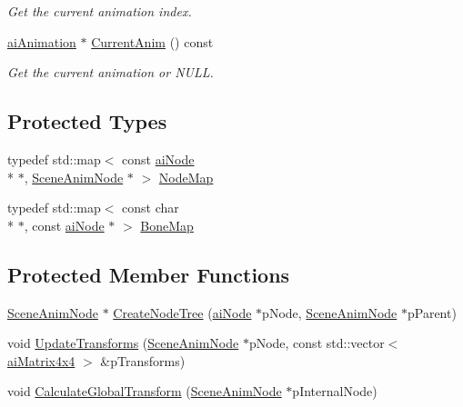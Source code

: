 \begin{DoxyCompactItemize}
\begin{DoxyCompactList}\small\item\em Get the current animation index. \end{DoxyCompactList}\item 
\hypertarget{class_assimp_view_1_1_scene_animator_a35c087279955cef0b9888d338bbd197d}{\hyperlink{structai_animation}{ai\+Animation} $\ast$ \hyperlink{class_assimp_view_1_1_scene_animator_a35c087279955cef0b9888d338bbd197d}{Current\+Anim} () const }\label{class_assimp_view_1_1_scene_animator_a35c087279955cef0b9888d338bbd197d}

\begin{DoxyCompactList}\small\item\em Get the current animation or N\+U\+L\+L. \end{DoxyCompactList}\end{DoxyCompactItemize}
\subsection*{Protected Types}
\begin{DoxyCompactItemize}
\item 
typedef std\+::map$<$ const \hyperlink{structai_node}{ai\+Node} \\*
$\ast$, \hyperlink{struct_assimp_view_1_1_scene_anim_node}{Scene\+Anim\+Node} $\ast$ $>$ \hyperlink{class_assimp_view_1_1_scene_animator_aa14c2ffd5c92d72e07905ce9a7f43c36}{Node\+Map}
\item 
typedef std\+::map$<$ const char \\*
$\ast$, const \hyperlink{structai_node}{ai\+Node} $\ast$ $>$ \hyperlink{class_assimp_view_1_1_scene_animator_a0d705443f7c558756e8816763a2777c2}{Bone\+Map}
\end{DoxyCompactItemize}
\subsection*{Protected Member Functions}
\begin{DoxyCompactItemize}
\item 
\hyperlink{struct_assimp_view_1_1_scene_anim_node}{Scene\+Anim\+Node} $\ast$ \hyperlink{class_assimp_view_1_1_scene_animator_a3bbce6d002dbbc7ec1a30fc467a97706}{Create\+Node\+Tree} (\hyperlink{structai_node}{ai\+Node} $\ast$p\+Node, \hyperlink{struct_assimp_view_1_1_scene_anim_node}{Scene\+Anim\+Node} $\ast$p\+Parent)
\item 
void \hyperlink{class_assimp_view_1_1_scene_animator_a8d108ebc1aee4a86d162accc0e40ebe7}{Update\+Transforms} (\hyperlink{struct_assimp_view_1_1_scene_anim_node}{Scene\+Anim\+Node} $\ast$p\+Node, const std\+::vector$<$ \hyperlink{structai_matrix4x4}{ai\+Matrix4x4} $>$ \&p\+Transforms)
\item 
void \hyperlink{class_assimp_view_1_1_scene_animator_aaffdfbd7ebf7787f81f6f48e1466da3a}{Calculate\+Global\+Transform} (\hyperlink{struct_assimp_view_1_1_scene_anim_node}{Scene\+Anim\+Node} $\ast$p\+Internal\+Node)
\end{DoxyCompactItemize}
